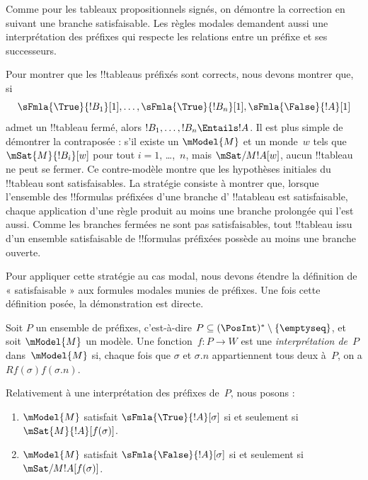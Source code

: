 \documentclass[../../../include/open-logic-section]{subfiles}
\begin{document}


\begin{explain}
Comme pour les tableaux propositionnels signés, on démontre la
correction en suivant une branche satisfaisable. Les règles
modales demandent aussi une interprétation des préfixes qui
respecte les relations entre un préfixe et ses successeurs.
\end{explain}

\begin{explain}
  Pour montrer que les !!{tableau}s préfixés sont corrects, nous devons
  montrer que, si
  \[
  \sFmla{\True}{!B_1}[1], \dots, \sFmla{\True}{!B_n}[1], \sFmla{\False}{!A}[1]
  \]
  admet un !!{tableau} fermé, alors $!B_1, \dots, !B_n \Entails !A$.
  Il est plus simple de démontrer la contraposée : s'il existe un
  $\mModel{M}$ et un monde~$w$ tels que $\mSat{M}{!B_i}[w]$ pour tout
  $i=1$, \dots,~$n$, mais $\mSat/{M}{!A}[w]$, aucun !!{tableau} ne peut
  se fermer. Ce contre-modèle montre que les hypothèses initiales du
  !!{tableau} sont satisfaisables. La stratégie consiste à montrer que,
  lorsque l’ensemble des !!{formula}s préfixées d'une branche d'%
  !!a{tableau} est satisfaisable, chaque application d'une règle
  produit au moins une branche prolongée qui l'est aussi. Comme les
  branches fermées ne sont pas satisfaisables, tout !!{tableau} issu
  d'un ensemble satisfaisable de !!{formula}s préfixées possède au
  moins une branche ouverte.

  Pour appliquer cette stratégie au cas modal, nous devons étendre la
  définition de « satisfaisable » aux formules modales munies de
  préfixes. Une fois cette définition posée, la démonstration est
  directe.
\end{explain}

\begin{defn}
  Soit $P$ un ensemble de préfixes, c'est-à-dire $P \subseteq (\PosInt)^*
  \setminus \{\emptyseq\}$, et soit $\mModel{M}$ un modèle. Une
  fonction~$f\colon P \to W$ est une \emph{interprétation de}~$P$
  dans~$\mModel{M}$ si, chaque fois que $\sigma$ et $\sigma.n$
  appartiennent tous deux à~$P$, on a $Rf(\sigma)f(\sigma.n)$.

  Relativement à une interprétation des préfixes de~$P$, nous posons :
  \begin{enumerate}
  \item $\mModel{M}$ satisfait $\sFmla{\True}{!A}[\sigma]$ si et seulement si
    $\mSat{M}{!A}[f(\sigma)]$.
  \item $\mModel{M}$ satisfait $\sFmla{\False}{!A}[\sigma]$ si et seulement si
    $\mSat/{M}{!A}[f(\sigma)]$.
  \end{enumerate}
\end{defn}
\end{document}
